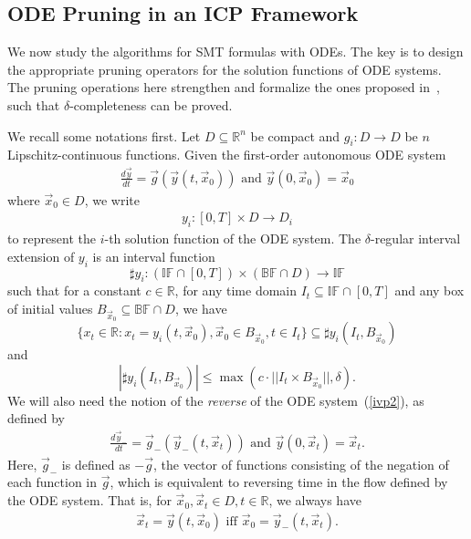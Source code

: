 \documentclass[12pt]{article}
\begin{document}
\subsection{ODE Pruning in an ICP Framework}

We now study the algorithms for SMT formulas with ODEs. The key is to design the appropriate pruning operators for the solution functions of ODE systems. The pruning operations here strengthen and formalize the ones proposed in~\cite{Eggers2008,Eggers2011,DBLP:conf/cp/GoldsztejnMEH10}, such that $\delta$-completeness can be proved. 

We recall some notations first. Let $D\subseteq \mathbb{R}^n$ be compact and $g_i: D\rightarrow D$ be $n$ Lipschitz-continuous functions. Given the first-order autonomous ODE system
\begin{eqnarray}\label{ivp2}
\frac{d \vec y}{dt} = \vec g(\vec y(t, \vec x_0)) \mbox{ and }\vec y(0, \vec x_0) = \vec x_0
\end{eqnarray}
where $\vec x_0\in D$, we write
\begin{eqnarray*}\label{ivp_solution}
y_i: [0, T]\times D\rightarrow D_i
\end{eqnarray*}
to represent the $i$-th solution function of the ODE system. The $\delta$-regular interval extension of $y_i$ is an interval function
$$\sharp y_i: (\mathbb{IF}\cap [0,T])\times (\mathbb{BF}\cap D) \rightarrow \mathbb{IF}$$
such that for a constant $c\in \mathbb{R}$, for any time domain $I_t\subseteq \mathbb{IF}\cap [0,T]$ and any box of initial values $B_{\vec x_0}\subseteq \mathbb{BF}\cap D$, we have
$$\{x_{t}\in \mathbb{R}: x_{t} = y_i(t, \vec x_0), \vec x_0\in B_{\vec x_0}, t\in I_t\}\subseteq \sharp y_i(I_t, B_{\vec x_0})$$
and
$$|\sharp y_i(I_t, B_{\vec x_0})|\leq \max(c\cdot||I_t\times B_{\vec x_0}||, \delta).$$
We will also need the notion of the {\em reverse} of the ODE system~(\ref{ivp2}), as defined by
\begin{eqnarray}\label{ivpi2}
\frac{d \vec y_-}{dt} = \vec g_-(\vec y_-(t, \vec x_t)) \mbox{ and }\vec y(0, \vec x_t) = \vec x_t.
\end{eqnarray}
Here, $\vec{g}_-$ is defined as $-\vec g$, the vector of functions consisting of the negation of each function in $\vec g$, which is equivalent to reversing time in the flow defined by the ODE system. That is, for $\vec x_0,\vec x_t\in D, t\in \mathbb{R}$, we always have
\begin{eqnarray}
\vec x_t = \vec y (t, \vec x_0)\mbox{ iff }\vec x_0 = \vec y_-(t,\vec x_t).
\end{eqnarray}
\end{document}
